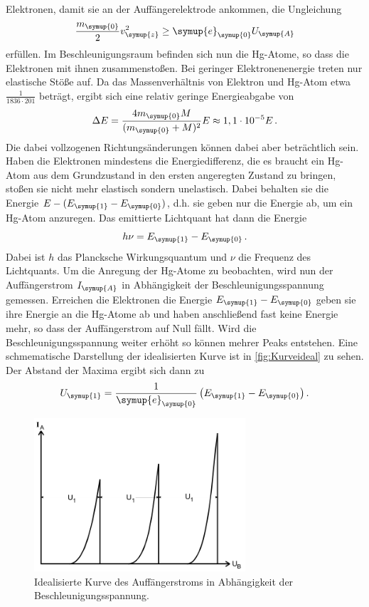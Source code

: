 Elektronen, damit sie an der Auffängerelektrode ankommen, die Ungleichung
\begin{equation}
    \label{eqn:E_Ungleichung}
    \frac{m_{\symup{0}}}{2} v_{\symup{z}}^2 \geq \symup{e}_{\symup{0}} U_{\symup{A}}
\end{equation}
erfüllen. Im Beschleunigungsraum befinden sich nun die Hg-Atome, so dass die Elektronen mit ihnen zusammenstoßen.
Bei geringer Elektronenenergie treten nur elastische Stöße auf. Da das Massenverhältnis von Elektron und Hg-Atom
etwa $\frac{1}{1836 \cdot 201}$ beträgt, ergibt sich eine relativ geringe Energieabgabe von
\begin{equation}
    \label{eqn:EnergieAbgabe}
    \Delta E = \frac{4 m_{\symup{0}} M}{(m_{\symup{0}} + M)^2} E \approx 1,1\cdot 10^{-5} E\,.
\end{equation}
Die dabei vollzogenen Richtungsänderungen können dabei aber beträchtlich sein. Haben die Elektronen mindestens die
Energiedifferenz, die es braucht ein Hg-Atom aus dem Grundzustand in den ersten angeregten Zustand zu bringen,
stoßen sie nicht mehr elastisch sondern unelastisch. Dabei behalten sie die Energie $E - (E_{\symup{1}} - 
E_{\symup{0}})$, d.h. sie geben nur die Energie ab, um ein Hg-Atom anzuregen. Das emittierte Lichtquant hat dann
die Energie
\begin{equation}
    \label{eqn:Emission}
    h\nu = E_{\symup{1}} - E_{\symup{0}}\,.
\end{equation}
Dabei ist $h$ das Plancksche Wirkungsquantum und $\nu$ die Frequenz des Lichtquants.
Um die Anregung der Hg-Atome zu beobachten, wird nun der Auffängerstrom $I_{\symup{A}}$ in Abhängigkeit der
Beschleunigungsspannung gemessen. Erreichen die Elektronen die Energie $E_{\symup{1}} - E_{\symup{0}}$ geben
sie ihre Energie an die Hg-Atome ab und haben anschließend fast keine Energie mehr, so dass der Auffängerstrom
auf Null fällt. Wird die Beschleunigungsspannung weiter erhöht so können mehrer Peaks entstehen. Eine schmematische
Darstellung der idealisierten Kurve ist in \autoref{fig:Kurveideal} zu sehen. Der Abstand der Maxima ergibt sich
dann zu
\begin{equation}
    \label{eqn:Spannung}
    U_{\symup{1}} = \frac{1}{\symup{e}_{\symup{0}}}\left(E_{\symup{1}}-E_{\symup{0}}\right).
\end{equation}
\begin{figure}
    \centering
    \includegraphics[width=0.7\textwidth]{Bilder/idealisierteKurve.png}
    \caption{Idealisierte Kurve des Auffängerstroms in Abhängigkeit der Beschleunigungsspannung.}
    \label{fig:Kurveideal}
\end{figure}


